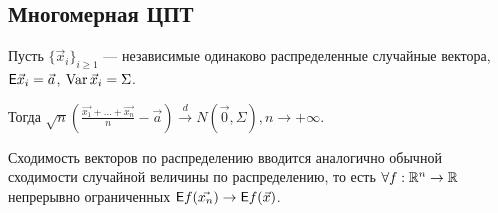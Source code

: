 \subsection{Многомерная ЦПТ}
    \begin{theorem}
    	Пусть $\{\vec x_i\}_{i \geqslant 1}$ --- независимые одинаково распределенные случайные вектора, $\mathsf{E} \vec{x}_i = \vec{a}$, $\operatorname{Var} \vec{x}_i = \Sigma$.
    	
    	Тогда $\sqrt{n} \left(\frac{\vec{x_1} + \ldots + \vec{x_n}}{n} - \vec{a} \right) \xrightarrow{d} N(\vec{0}, \Sigma), n \rightarrow +\infty$.
    \end{theorem}
    
\begin{note}
	Сходимость векторов по распределению вводится аналогично обычной сходимости случайной величины по распределению, то есть $\forall f: \mathbb{R}^n \rightarrow \mathbb{R}$ непрерывно ограниченных $\mathsf{E} f(\vec{x_n}) \rightarrow \mathsf{E} f(\vec{x})$.
\end{note}